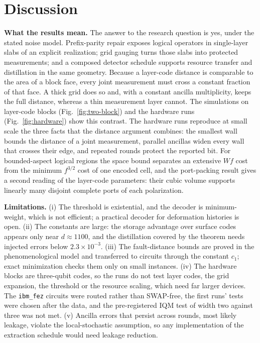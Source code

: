 \documentclass[10pt,a4paper,twocolumn]{article}
\begin{document}
\section{Discussion}
\label{sec:discussion}
\textbf{What the results mean.}  The answer to the research question is yes,
under the stated noise model.  Prefix-parity repair exposes logical operators in
single-layer slabs of an explicit realization; grid gauging turns those slabs
into protected measurements; and a composed detector schedule supports resource
transfer and distillation in the same geometry.  Because a layer-code distance
is comparable to the area of a block face, every joint measurement must cross a
constant fraction of that face.  A thick grid does so and, with a constant
ancilla multiplicity, keeps the full distance, whereas a thin measurement layer
cannot.  The simulations on layer-code blocks (Fig.~\ref{fig:two-block}) and the
hardware runs (Fig.~\ref{fig:hardware}) show this contrast.  The hardware runs
reproduce at small scale the three facts that the distance argument combines:
the smallest wall bounds the distance of a joint measurement, parallel ancillas
widen every wall that crosses their edge, and repeated rounds protect the
reported bit.  For bounded-aspect logical regions the space bound separates an
extensive $Wf$ cost from the minimum $f^{3/2}$ cost of one encoded cell, and the
port-packing result gives a second reading of the layer-code parameters: their
cubic volume supports linearly many disjoint complete ports of each
polarization.

\textbf{Limitations.}  (i) The threshold is existential, and the decoder is
minimum-weight, which is not efficient; a practical decoder for deformation
histories is open.  (ii) The constants are large: the storage advantage over
surface codes appears only near $d\approx1100$, and the distillation covered by
the theorem needs injected errors below $2.3\times10^{-3}$.  (iii) The
fault-distance bounds are proved in the phenomenological model and transferred
to circuits through the constant $c_1$; exact minimization checks them only on
small instances.  (iv) The hardware blocks
are three-qubit codes, so the runs do not test layer codes, the grid expansion,
the threshold or the resource scaling, which need far larger devices.  The
\texttt{ibm\_fez} circuits were routed rather than SWAP-free, the first runs'
tests were chosen after the data, and the pre-registered IQM test of width two
against three was not met.  (v) Ancilla errors that persist across rounds, most
likely leakage, violate the local-stochastic assumption, so any implementation
of the extraction schedule would need leakage reduction.
\end{document}
